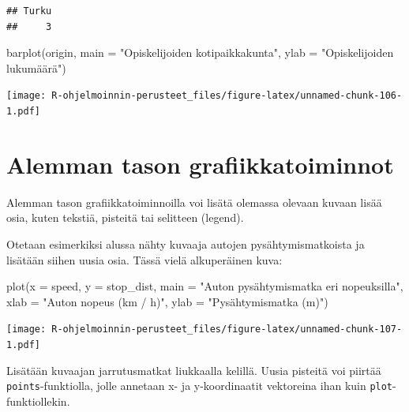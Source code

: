 \documentclass[
]{book}
\newenvironment{Shaded}{\begin{snugshade}}{\end{snugshade}}
\newcommand{\AttributeTok}[1]{\textcolor[rgb]{0.77,0.63,0.00}{#1}}
\newcommand{\FunctionTok}[1]{\textcolor[rgb]{0.00,0.00,0.00}{#1}}
\newcommand{\NormalTok}[1]{#1}
\newcommand{\StringTok}[1]{\textcolor[rgb]{0.31,0.60,0.02}{#1}}
\begin{document}
\begin{verbatim}
## Turku 
##     3
\end{verbatim}

\begin{Shaded}
\begin{Highlighting}[]
\FunctionTok{barplot}\NormalTok{(origin, }
        \AttributeTok{main =} \StringTok{"Opiskelijoiden kotipaikkakunta"}\NormalTok{,}
        \AttributeTok{ylab =} \StringTok{"Opiskelijoiden lukumäärä"}\NormalTok{)}
\end{Highlighting}
\end{Shaded}

\texttt{[image: R-ohjelmoinnin-perusteet\_files/figure-latex/unnamed-chunk-106-1.pdf]}

\hypertarget{alemman-tason-grafiikkatoiminnot}{%
\section{Alemman tason grafiikkatoiminnot}\label{alemman-tason-grafiikkatoiminnot}}

Alemman tason grafiikkatoiminnoilla voi lisätä olemassa olevaan kuvaan lisää osia, kuten tekstiä, pisteitä tai selitteen (legend).

Otetaan esimerkiksi alussa nähty kuvaaja autojen pysähtymismatkoista ja lisätään siihen uusia osia. Tässä vielä alkuperäinen kuva:

\begin{Shaded}
\begin{Highlighting}[]
\FunctionTok{plot}\NormalTok{(}\AttributeTok{x =}\NormalTok{ speed, }\AttributeTok{y =}\NormalTok{ stop\_dist,}
     \AttributeTok{main =} \StringTok{"Auton pysähtymismatka eri nopeuksilla"}\NormalTok{,}
     \AttributeTok{xlab =} \StringTok{"Auton nopeus (km / h)"}\NormalTok{, }\AttributeTok{ylab =} \StringTok{"Pysähtymismatka (m)"}\NormalTok{)}
\end{Highlighting}
\end{Shaded}

\texttt{[image: R-ohjelmoinnin-perusteet\_files/figure-latex/unnamed-chunk-107-1.pdf]}

Lisätään kuvaajan jarrutusmatkat liukkaalla kelillä. Uusia pisteitä voi piirtää \texttt{points}-funktiolla, jolle annetaan x- ja y-koordinaatit vektoreina ihan kuin \texttt{plot}-funktiollekin.
\end{document}
